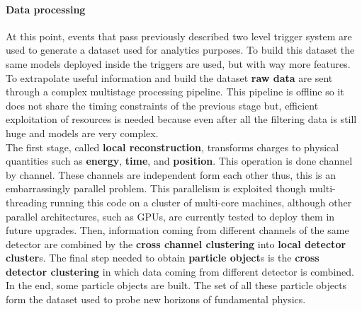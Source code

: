 \paragraph{Data processing} 
At this point, events that pass previously described two level trigger system are used to generate a dataset used for analytics purposes. To build this dataset the same models deployed inside the triggers are used, but with way more features. To extrapolate useful information and build the dataset \textbf{raw data} are sent through a complex multistage processing pipeline. This pipeline is offline so it does not share the timing constraints of the previous stage but, efficient exploitation of resources is needed because even after all the filtering data is still huge and models are very complex. \\
The first stage, called \textbf{local reconstruction}, transforms charges to physical quantities such as \textbf{energy}, \textbf{time}, and \textbf{position}. This operation is done channel by channel. These channels are independent form each other thus, this is an embarrassingly parallel problem. This parallelism is exploited though multi-threading running this code on a cluster of multi-core machines, although other parallel architectures, such as GPUs, are currently tested to deploy them in future upgrades. Then, information coming from different channels of the same detector are combined by the \textbf{cross channel clustering} into \textbf{local detector cluster}s. The final step needed to obtain \textbf{particle object}s is the \textbf{cross detector clustering} in which data coming from different detector is combined. In the end, some particle objects are built. The set of all these particle objects form the dataset used to probe new horizons of fundamental physics.\\
